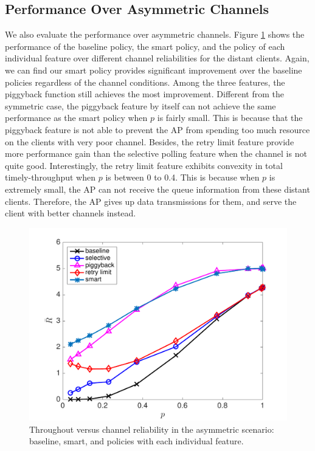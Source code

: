 \documentclass{article}
\begin{document}
\subsection{Performance Over Asymmetric Channels}
We also evaluate the performance over asymmetric channels.
Figure \ref{sim: asym: three features} shows the performance of the baseline policy, the smart policy, and the policy of each individual feature over different channel reliabilities for the distant clients. Again, we can find our smart policy provides significant improvement over the baseline policies regardless of the channel conditions.
Among the three features, the piggyback function still achieves the most improvement. Different from the symmetric case, the piggyback feature by itself can not achieve the same performance as the smart policy when $p$ is fairly small. This is because that the piggyback feature is not able to prevent the AP from spending too much resource on the clients with very poor channel. Besides, the retry limit feature provide more performance gain than the selective polling feature when the channel is not quite good. Interestingly, the retry limit feature exhibits convexity in total timely-throughput when $p$ is between 0 to 0.4. This is because when $p$ is extremely small, the AP can not receive the queue information from these distant clients. Therefore, the AP gives up data transmissions for them, and serve the client with better channels instead.

\begin{figure}[htbp]
\centering
\includegraphics[scale=0.5]{3policycompare_asym.pdf}
\caption{Throughout versus channel reliability in the asymmetric scenario: baseline, smart, and policies with each individual feature.}
\label{sim: asym: three features}
\end{figure}
\end{document}
